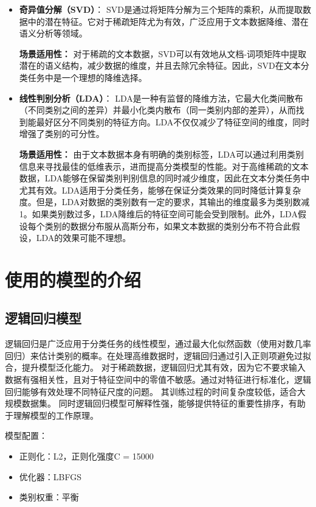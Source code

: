 \documentclass[11pt,a4paper]{article}
\begin{document}
\begin{itemize}
\begin{itemize}
        \item \textbf{奇异值分解（SVD）}：
        SVD是通过将矩阵分解为三个矩阵的乘积，从而提取数据中的潜在特征。它对于稀疏矩阵尤为有效，广泛应用于文本数据降维、潜在语义分析等领域。
        
        \textbf{场景适用性：} 对于稀疏的文本数据，SVD可以有效地从文档-词项矩阵中提取潜在的语义结构，减少数据的维度，并且去除冗余特征。因此，SVD在文本分类任务中是一个理想的降维选择。
    
        \item \textbf{线性判别分析（LDA）}：
        LDA是一种有监督的降维方法，它最大化类间散布（不同类别之间的差异）并最小化类内散布（同一类别内部的差异），从而找到能最好区分不同类别的特征方向。LDA不仅仅减少了特征空间的维度，同时增强了类别的可分性。
    
        \textbf{场景适用性：} 由于文本数据本身有明确的类别标签，LDA可以通过利用类别信息来寻找最佳的低维表示，进而提高分类模型的性能。对于高维稀疏的文本数据，LDA能够在保留类别判别信息的同时减少维度，因此在文本分类任务中尤其有效。LDA适用于分类任务，能够在保证分类效果的同时降低计算复杂度。但是，LDA对数据的类别数有一定的要求，其输出的维度最多为类别数减1。如果类别数过多，LDA降维后的特征空间可能会受到限制。此外，LDA假设每个类别的数据分布服从高斯分布，如果文本数据的类别分布不符合此假设，LDA的效果可能不理想。
    \end{itemize}
    

\end{itemize}

\section{使用的模型的介绍}

\subsection{逻辑回归模型}
逻辑回归是广泛应用于分类任务的线性模型，通过最大化似然函数（使用对数几率回归）来估计类别的概率。在处理高维数据时，逻辑回归通过引入正则项避免过拟合，提升模型泛化能力。
对于稀疏数据，逻辑回归尤其有效，因为它不要求输入数据有强相关性，且对于特征空间中的零值不敏感。通过对特征进行标准化，逻辑回归能够有效处理不同特征尺度的问题。
其训练过程的时间复杂度较低，适合大规模数据集。
同时逻辑回归模型可解释性强，能够提供特征的重要性排序，有助于理解模型的工作原理。

模型配置：
\begin{itemize}
    \item 正则化：L2，正则化强度C = 15000
    \item 优化器：LBFGS
    \item 类别权重：平衡
\end{itemize}
\end{document}

